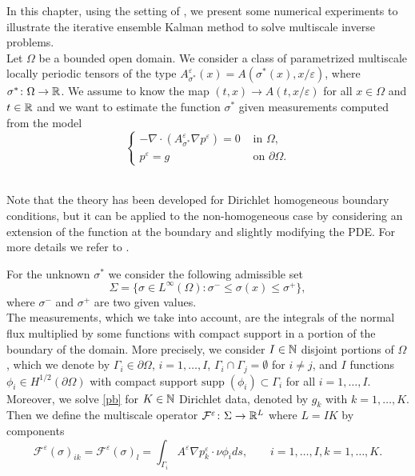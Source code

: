 \documentclass[10pt]{article}
\begin{document}
In this chapter, using the setting of \cite{AbD18}, we present some numerical experiments to illustrate the iterative ensemble Kalman method to solve multiscale inverse problems. \\
Let $\Omega$ be a bounded open domain. We consider a class of parametrized multiscale locally periodic tensors of the type $A^{\varepsilon}_{\sigma^*}(x) = A(\sigma^*(x),x/\varepsilon)$, where $\sigma^* \colon \Omega \to \mathbb{R}$. We assume to know the map $(t,x) \to A(t,x/\varepsilon)$ for all $x \in \Omega$ and $t \in \mathbb{R}$ and we want to estimate the function $\sigma^*$ given measurements computed from the model
\begin{equation}
\label{pb}
\begin{cases}
- \nabla \cdot ( A^{\varepsilon}_{\sigma^*} \nabla p^{\varepsilon} ) = 0 & \text{ in } \Omega, \\
p^{\varepsilon} = g & \text{ on } \partial \Omega.
\end{cases}
\end{equation}
\begin{remark}
\leavevmode \\
Note that the theory has been developed for Dirichlet homogeneous boundary conditions, but it can be applied to the non-homogeneous case by considering an extension of the function at the boundary and slightly modifying the PDE. For more details we refer to \cite[Remark 8.10]{Sal16}.
\end{remark}
For the unknown $\sigma^*$ we consider the following admissible set
\[ \Sigma = \{ \sigma \in L^{\infty}(\Omega) \colon \sigma^- \le \sigma(x) \le \sigma^+ \}, \]
where $\sigma^-$ and $\sigma^+$ are two given values. \\
The measurements, which we take into account, are the integrals of the normal flux multiplied by some functions with compact support in a portion of the boundary of the domain. More precisely, we consider $I \in \mathbb{N}$ disjoint portions of $\Omega$, which we denote by $\Gamma_i \in \partial \Omega$, $i = 1, \dots, I$, $\Gamma_i \cap \Gamma_j = \emptyset$ for $i \neq j$, and $I$ functions $\phi_i \in H^{1/2}(\partial \Omega)$ with compact support $\mathrm{supp} \; (\phi_i) \subset \Gamma_i$ for all $i = 1, \dots, I$. Moreover, we solve \eqref{pb} for $K \in \mathbb{N}$ Dirichlet data, denoted by $g_k$ with $k = 1, \dots, K$. Then we define the multiscale operator $\mathcal{F}^{\varepsilon} \colon \Sigma \to \mathbb{R}^L$ where $L = IK$ by components
\begin{equation}
\label{boundary_integral_e}
\mathcal{F}^{\varepsilon}(\sigma)_{ik} = \mathcal{F}^{\varepsilon}(\sigma)_{l} = \int_{\Gamma_i} A^{\varepsilon} \nabla p_k^{\varepsilon} \cdot \nu \phi_i ds, \qquad i = 1, \dots, I, k = 1, \dots, K.
\end{equation}
\end{document}
